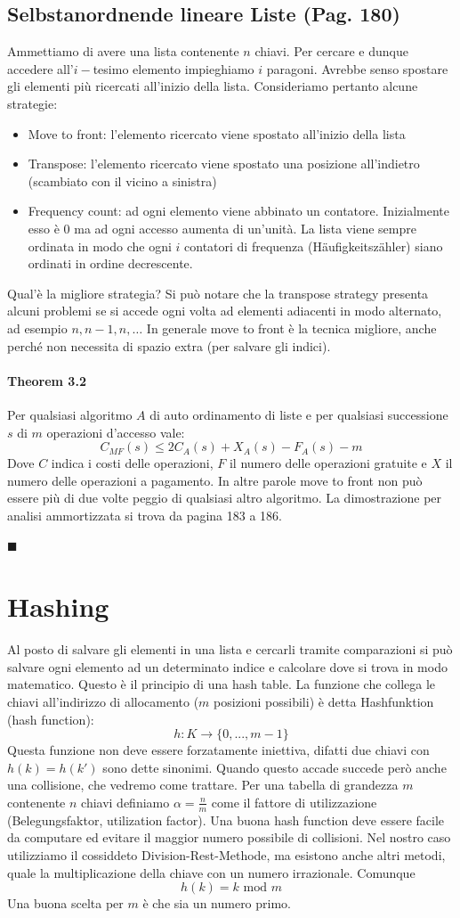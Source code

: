 \documentclass[a4paper]{book}
\newenvironment{mytheorem}[1]{\subsubsection*{Theorem #1}}{\begin{flushright}$\blacksquare$\end{flushright}}
\begin{document}
\section{Selbstanordnende lineare Liste (Pag. 180)}
Ammettiamo di avere una lista contenente $n$ chiavi. Per cercare e dunque accedere all'$i-$tesimo elemento impieghiamo $i$ paragoni. Avrebbe senso spostare gli elementi più ricercati all'inizio della lista. Consideriamo pertanto alcune strategie: 
\begin{itemize}
\item Move to front: l'elemento ricercato viene spostato all'inizio della lista
\item Transpose: l'elemento ricercato viene spostato una posizione all'indietro (scambiato con il vicino a sinistra)
\item Frequency count: ad ogni elemento viene abbinato un contatore. Inizialmente esso è 0 ma ad ogni accesso aumenta di un'unità. La lista viene sempre ordinata in modo che ogni $i$ contatori di frequenza (Häufigkeitszähler) siano ordinati in ordine decrescente. 
\end{itemize}
Qual'è la migliore strategia? Si può notare che la transpose strategy presenta alcuni problemi se si accede ogni volta ad elementi adiacenti in modo alternato, ad esempio $n,n-1,n,\dots$ In generale move to front è la tecnica migliore, anche perché non necessita di spazio extra (per salvare gli indici).
\begin{mytheorem}{3.2}
Per qualsiasi algoritmo $A$ di auto ordinamento di liste e per qualsiasi successione $s$ di $m$ operazioni d'accesso vale:
$$ C_{MF}(s) \leq 2C_A(s)+X_A(s)-F_A(s)-m $$
Dove $C$ indica i costi delle operazioni, $F$ il numero delle operazioni gratuite e $X$ il numero delle operazioni a pagamento. In altre parole move to front non può essere più di due volte peggio di qualsiasi altro algoritmo. La dimostrazione per analisi ammortizzata si trova da pagina 183 a 186.
\end{mytheorem}
\chapter{Hashing}
Al posto di salvare gli elementi in una lista e cercarli tramite comparazioni si può salvare ogni elemento ad un determinato indice e calcolare dove si trova in modo matematico. Questo è il principio di una hash table. La funzione che collega le chiavi all'indirizzo di allocamento ($m$ posizioni possibili) è detta Hashfunktion (hash function):
$$h: K \rightarrow \{0,..., m-1\}$$
Questa funzione non deve essere forzatamente iniettiva, difatti due chiavi con $h(k)=h(k')$ sono dette sinonimi. Quando questo accade succede però anche una collisione, che vedremo come trattare. Per una tabella di grandezza $m$ contenente $n$ chiavi definiamo $\alpha = \frac{n}{m} $ come il fattore di utilizzazione (Belegungsfaktor, utilization factor). Una buona hash function deve essere facile da computare ed evitare il maggior numero possibile di collisioni.
Nel nostro caso utilizziamo il cossiddeto Division-Rest-Methode, ma esistono anche altri metodi, quale la multiplicazione della chiave con un numero irrazionale. Comunque
$$ h(k)=k \mbox{ mod }m$$
Una buona scelta per $m$ è che sia un numero primo.
\end{document}
